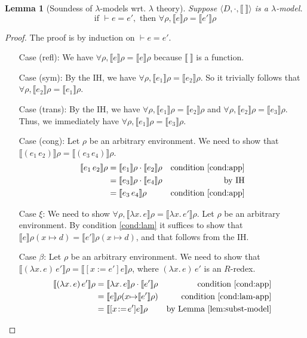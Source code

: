 \documentclass{tufte-handout}
\newcommand{\SEM}[1]{\llbracket #1 \rrbracket}
\newcommand{\LAM}[1]{\lambda #1.\,}
\newcommand{\APP}[0]{\,}
\newcommand{\by}[0]{\!:=\!}
\newcommand{\ext}[3]{#3(#1{\mapsto}#2)}
\newtheorem{lemma}[theorem]{Lemma}
\begin{document}
\begin{lemma}[Soundess of $\lambda$-models wrt. $\lambda$ theory]
  \label{lem:sound-model-theory}
  Suppose $\langle D,\cdot,\SEM{\ }\rangle$ is a $\lambda$-model.
  \[
  \text{if } \vdash e = e', \text{ then } \forall \rho, \SEM{e}\rho = \SEM{e'}\rho
  \]
\end{lemma}
\begin{proof}
  The proof is by induction on $\vdash e = e'$.
  \begin{itemize}
  \item[Case (refl):] We have $\forall \rho, \SEM{e}\rho = \SEM{e}\rho$
    because $\SEM{\ }$ is a function.
    
  \item[Case (sym):]
    By the IH, we have $\forall \rho, \SEM{e_1}\rho = \SEM{e_2}\rho$.
    So it trivially follows that $\forall \rho, \SEM{e_2}\rho = \SEM{e_1}\rho$.
    
  \item[Case (trans):]
    By the IH, we have $\forall \rho, \SEM{e_1}\rho = \SEM{e_2}\rho$
    and $\forall \rho, \SEM{e_2}\rho = \SEM{e_3}\rho$.
    Thus, we immediately have $\forall \rho, \SEM{e_1}\rho = \SEM{e_3}\rho$.
    
  \item[Case (cong):]
    Let $\rho$ be an arbitrary environment.
    We need to show that $\SEM{(e_1\APP e_2)}\rho = \SEM{(e_3\APP e_4)}\rho$.
    \begin{align*}
      \SEM{e_1\APP e_2}\rho &= \SEM{e_1}\rho \cdot \SEM{e_2}\rho & \text{condition \ref{cond:app}}\\
        &= \SEM{e_3}\rho \cdot \SEM{e_4}\rho & \text{by IH}\\
        &= \SEM{e_3\APP e_4}\rho & \text{condition \ref{cond:app}}
    \end{align*}
    
  \item[Case $\xi$:]
    We need to show $\forall \rho, \SEM{\LAM{x}e}\rho = \SEM{\LAM{x}e'}\rho$.
    Let $\rho$ be an arbitrary environment.
    By condition \ref{cond:lam} it suffices to show that
    $\SEM{e}\ext{x}{d}{\rho} = \SEM{e'}\ext{x}{d}{\rho}$,
    and that follows from the IH.

  \item[Case $\beta$:]
    Let $\rho$ be an arbitrary environment.
    We need to show that
    $\SEM{(\LAM{x}e)\APP e'}\rho = \SEM{[x\by e']e}\rho$,
    where $(\LAM{x}e)\APP e'$ is an $R$-redex.
    \begin{align*}
      \SEM{(\LAM{x}e)\APP e'}\rho &=
      \SEM{\LAM{x}e}\rho \cdot \SEM{e'}\rho & \text{condition \ref{cond:app}} \\
      &= \SEM{e} \ext{x}{\SEM{e'}\rho}{\rho} & \text{condition \ref{cond:lam-app}} \\
      &= \SEM{[x\by e']e}\rho & \text{by Lemma~\ref{lem:subst-model}}
    \end{align*}
    
  \end{itemize}
\end{proof}
\end{document}
